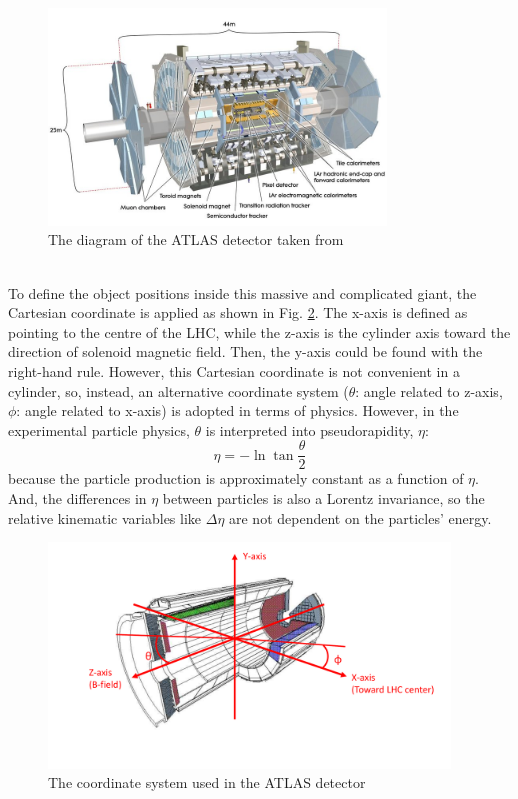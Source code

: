 \begin{figure}[!h]                
	\includegraphics[width=0.8\textwidth]{Chapter2/ATLAS.jpg}
	\centering
	\begin{center}
		\caption{The diagram of the ATLAS detector taken from \cite{PERF-2007-01}}
		\label{Fig:ATLAS}            
	\end{center}
\end{figure}
\noindent
\\To define the object positions inside this massive and complicated giant, the Cartesian coordinate is applied as shown in Fig. \ref{Fig:coordinate}. The x-axis is defined as pointing to the centre of the LHC, while the z-axis is the cylinder axis toward the direction of solenoid magnetic field. Then, the y-axis could be found with the right-hand rule. However, this Cartesian coordinate is not convenient in a cylinder, so, instead, an alternative coordinate system ($\theta$: angle related to z-axis, $\phi$: angle related to x-axis) is adopted in terms of physics. However, in the experimental particle physics, $\theta$ is interpreted into pseudorapidity, $\eta$:
\begin{equation}
\eta = -\ln{\tan{\frac{\theta}{2}}}
\end{equation}
\noindent
because the particle production is approximately constant as a function of $\eta$. And, the differences in $\eta$ between particles is also a Lorentz invariance, so the relative kinematic variables like $\Delta\eta$ are not dependent on the particles' energy. 
\begin{figure}[!h]                
	\includegraphics[width=0.95\textwidth]{Chapter2/coordinate}
	\centering
	\begin{center}
		\caption{The coordinate system used in the ATLAS detector}
		\label{Fig:coordinate}            
	\end{center}
\end{figure}
